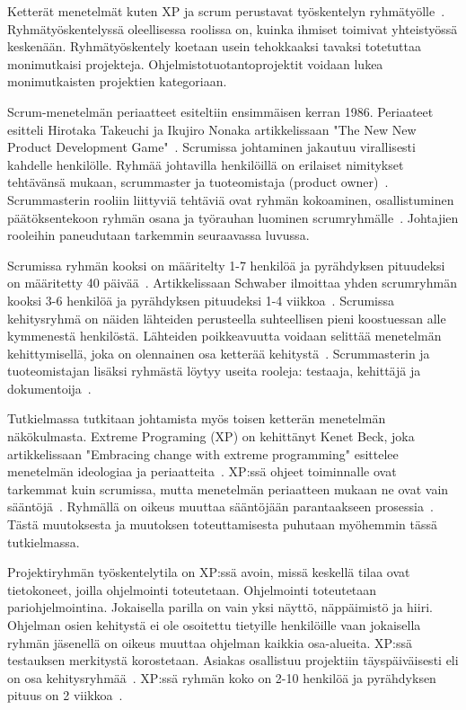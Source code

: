 \documentclass[finnish]{tktltiki2}
\theoremstyle{definition}
\theoremstyle{remark}
\begin{document}
Ketterät menetelmät kuten XP ja scrum perustavat työskentelyn ryh\-mä\-työl\-le~\cite{4755768}. Ryhmätyöskentelyssä oleellisessa roolissa on, kuinka ihmiset toimivat yhteistyössä keskenään. Ryhmätyöskentely koetaan usein tehokkaaksi tavaksi totetuttaa monimutkaisi projekteja. Ohjelmistotuotantoprojektit voidaan lukea monimutkaisten projektien kategoriaan. 

Scrum-menetelmän periaatteet esiteltiin ensimmäisen kerran 1986. Periaateet esitteli Hirotaka Takeuchi ja Ikujiro Nonaka artikkelissaan "The New New Product Development Game"~\cite{nonaka1986new}. Scrumissa johtaminen jakautuu virallisesti kahdelle henkilölle. Ryhmää johtavilla henkilöillä on erilaiset nimitykset tehtävänsä mukaan, scrummaster ja tuoteomistaja (product owner)~\cite{4755768}. Scrummasterin rooliin liittyviä tehtäviä ovat ryhmän kokoaminen, osallistuminen päätöksentekoon ryhmän osana ja työrauhan luominen scrumryhmälle~\cite{4755768}. Johtajien rooleihin paneudutaan tarkemmin seuraavassa luvussa.

Scrumissa ryhmän kooksi on määritelty 1-7 henkilöä ja pyrähdyksen pituudeksi on määritetty 40 päivää~\cite{cohen2004introduction}. Artikkelissaan Schwaber ilmoittaa yhden scrumryhmän kooksi 3-6 henkilöä ja pyrähdyksen pituudeksi 1-4 viikkoa~\cite{schwaber1995scrum}. Scrumissa kehitysryhmä on näiden lähteiden perusteella suhteellisen pieni koostuessan alle kymmenestä henkilöstä. Lähteiden poikkeavuutta voidaan selittää menetelmän kehittymisellä, joka on olennainen osa ketterää kehitystä~\cite{fowler2001agile}. Scrummasterin ja tuoteomistajan lisäksi ryhmästä löytyy useita rooleja: testaaja, kehittäjä ja dokumentoija~\cite{schwaber1995scrum}.

Tutkielmassa tutkitaan johtamista myös toisen ketterän menetelmän näkökulmasta. Extreme Programing (XP) on kehittänyt Kenet Beck, joka artikkelissaan "Embracing change with extreme programming" esittelee menetelmän ideologiaa ja periaatteita~\cite{796139}. XP:ssä ohjeet toiminnalle ovat tarkemmat kuin scrumissa, mutta menetelmän periaatteen mukaan ne ovat vain sääntöjä~\cite{cohen2004introduction}. Ryhmällä on oikeus muuttaa sääntöjään parantaakseen prosessia~\cite{cohen2004introduction}. Tästä muutoksesta ja muutoksen toteuttamisesta puhutaan myöhemmin tässä tutkielmassa. 

Projektiryhmän työskentelytila on XP:ssä avoin, missä keskellä tilaa ovat tietokoneet, joilla ohjelmointi toteutetaan. Ohjelmointi toteutetaan pariohjelmointina. Jokaisella parilla on vain yksi näyttö, näppäimistö ja hiiri. Ohjelman osien kehitystä ei ole osoitettu tietyille henkilöille vaan jokaisella ryhmän jäsenellä on oikeus muuttaa ohjelman kaikkia osa-alueita. XP:ssä testauksen merkitystä korostetaan. Asiakas osallistuu projektiin täyspäiväisesti eli on osa kehitysryhmää~\cite{796139}. XP:ssä ryhmän koko on 2-10 henkilöä ja pyrähdyksen pituus on 2 viikkoa~\cite{cohen2004introduction}. 
\end{document}
